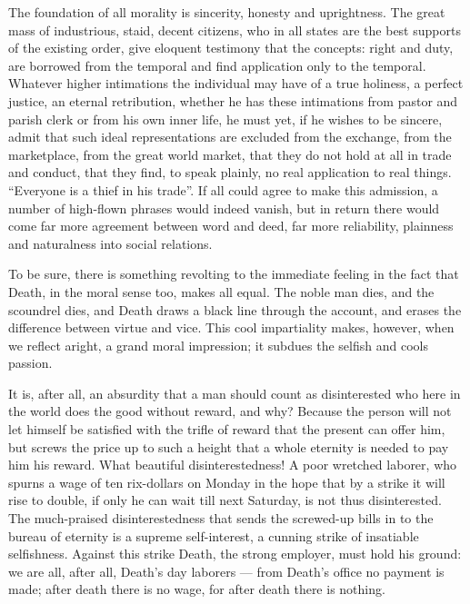 \documentclass[12pt,a4paper,openany]{book}
\newcommand{\opage}[1]{\marginnote{\footnotesize\textit{[#1]}}}
\begin{document}
The foundation of all morality is sincerity, honesty
and uprightness. The great mass of industrious, staid,
decent citizens, who in all states are
the best supports of the existing order, give eloquent testimony
that the concepts: right and duty, are borrowed from the
\setcounter{footnote}{0}%
\opage{205}temporal and find application only to the temporal.
Whatever higher intimations the individual may have of a true
holiness, a perfect justice, an eternal retribution,
whether he has these intimations from pastor and
parish clerk or from his own inner life, he must yet, if he
wishes to be sincere, admit that such ideal representations
are excluded from the exchange, from the marketplace, from the great world market,
that they do not hold at all in trade and conduct, that
they find, to speak plainly, no real application to
real things. ``Everyone is a thief in his trade''. If
all could agree to make this admission,
a number of high-flown phrases would indeed vanish,
but in return there would come far more
agreement between word and deed, far more
reliability, plainness and naturalness into social
relations.

To be sure, there is something revolting to the immediate feeling
in the fact that Death, in the moral sense too, makes
all equal. The noble man dies, and the scoundrel dies, and Death
draws a black line through the account, and erases the difference
between virtue and vice. This cool impartiality
makes, however, when we reflect aright, a grand moral
impression; it subdues the selfish and cools passion.

It is, after all, an absurdity that a man should
count as disinterested who here in the world does the good
without reward, and why? Because the person will not let himself
be satisfied with the trifle of reward that the present can offer him,
but screws the price up to such a height that
a whole eternity is needed to pay him his reward. What
beautiful disinterestedness! A poor wretched laborer, who
\setcounter{footnote}{0}%
\opage{206}spurns a wage of ten rix-dollars on Monday in the
hope that by a strike it will rise to double,
if only he can wait till next Saturday, is not thus
disinterested. The much-praised disinterestedness that
sends the screwed-up bills in to the bureau of eternity
is a supreme self-interest, a cunning strike of
insatiable selfishness. Against this strike Death, the
strong employer, must hold his ground: we are all, after all, Death's
day laborers --- from Death's office no payment is made;
after death there is no wage, for after death there is
nothing.
\end{document}
